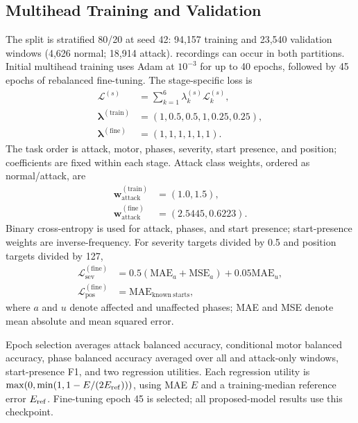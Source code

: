 \documentclass[conference]{IEEEtran}
\begin{document}
\subsection{Multihead Training and Validation}
The split is stratified 80/20 at seed 42: 94,157 training and 23,540 validation windows (4,626 normal; 18,914 attack). recordings can occur in both partitions.  Initial multihead training uses Adam at $10^{-3}$ for up to 40 epochs, followed by 45 epochs of rebalanced fine-tuning. The stage-specific loss is
\begin{equation}
\begin{aligned}
\mathcal{L}^{(s)} &= \sum_{k=1}^{6}\lambda_k^{(s)}\mathcal{L}_k^{(s)},\\
\boldsymbol{\lambda}^{(\mathrm{train})} &= (1,0.5,0.5,1,0.25,0.25),\\
\boldsymbol{\lambda}^{(\mathrm{fine})} &= (1,1,1,1,1,1).
\end{aligned}
\label{eq:multitask_loss}
\end{equation}
The task order is attack, motor, phases, severity, start presence, and position; coefficients are fixed within each stage. Attack class weights, ordered as normal/attack, are
\begin{equation}
\begin{aligned}
\mathbf{w}_{\mathrm{attack}}^{(\mathrm{train})} &= (1.0,1.5),\\
\mathbf{w}_{\mathrm{attack}}^{(\mathrm{fine})} &= (2.5445,0.6223).
\end{aligned}
\label{eq:attack_weights}
\end{equation}
Binary cross-entropy is used for attack, phases, and start presence; start-presence weights are inverse-frequency. For severity targets divided by 0.5 and position targets divided by 127,
\begin{equation}
\begin{aligned}
\mathcal{L}_{\mathrm{sev}}^{(\mathrm{fine})} &= 0.5(\mathrm{MAE}_{a}+\mathrm{MSE}_{a})+0.05\mathrm{MAE}_{u},\\
\mathcal{L}_{\mathrm{pos}}^{(\mathrm{fine})} &= \mathrm{MAE}_{\mathrm{known\ starts}},
\end{aligned}
\end{equation}
where $a$ and $u$ denote affected and unaffected phases; MAE and MSE denote mean absolute and mean squared error.

Epoch selection averages attack balanced accuracy, conditional motor balanced accuracy, phase balanced accuracy averaged over all and attack-only windows, start-presence F1, and two regression utilities. Each regression utility is $\max(0,\min(1,1-E/(2E_{\rm ref})))$, using MAE $E$ and a training-median reference error $E_{\rm ref}$. Fine-tuning epoch 45 is selected; all proposed-model results use this checkpoint.
\end{document}
